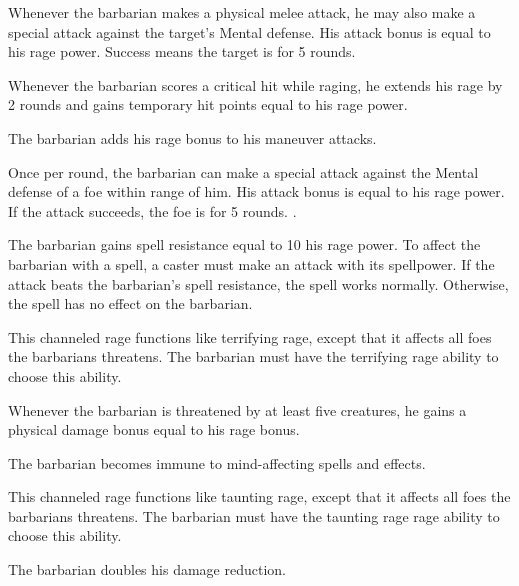 Whenever the barbarian makes a physical melee attack, he may also make a special attack against the target's Mental defense.
His attack bonus is equal to his rage power.
Success means the target is \shaken for 5 rounds.
\norepeatnotes

Whenever the barbarian scores a critical hit while raging, he extends his rage by 2 rounds and gains temporary hit points equal to his rage power.

The barbarian adds his rage bonus to his maneuver attacks.

Once per round, the barbarian can make a special attack against the Mental defense of a foe within \rngmed range of him.
His attack bonus is equal to his rage power.
If the attack succeeds, the foe is \taunted for 5 rounds.
\norepeatnotes.

The barbarian gains spell resistance equal to 10 \add his rage power.
To affect the barbarian with a spell, a caster must make an attack with its spellpower.
If the attack beats the barbarian's spell resistance, the spell works normally.
Otherwise, the spell has no effect on the barbarian.

This channeled rage functions like terrifying rage, except that it affects all foes the barbarians threatens.
The barbarian must have the terrifying rage ability to choose this ability.

Whenever the barbarian is threatened by at least five creatures, he gains a physical damage bonus equal to his rage bonus.

The barbarian becomes immune to mind-affecting spells and effects.

This channeled rage functions like taunting rage, except that it affects all foes the barbarians threatens.
The barbarian must have the taunting rage rage ability to choose this ability.


The barbarian doubles his damage reduction.

